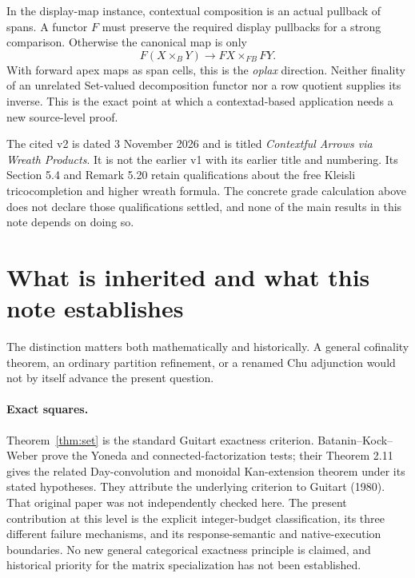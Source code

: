 \documentclass[11pt]{article}
\theoremstyle{definition}\newtheorem{definition}[theorem]{Definition}
\theoremstyle{remark}\newtheorem{remark}[theorem]{Remark}
\begin{document}
In the display-map instance, contextual composition is an actual pullback
of spans. A functor $F$ must preserve the required display pullbacks for
a strong comparison. Otherwise the canonical map is only
\[
 F(X\times_BY)\longrightarrow FX\times_{FB}FY.
\]
With forward apex maps as span cells, this is the \emph{oplax} direction.
Neither finality of an unrelated Set-valued decomposition functor nor a
row quotient supplies its inverse. This is the exact point at which a
contextad-based application needs a new source-level proof.

The cited v2 is dated 3 November 2026 and is titled \emph{Contextful
Arrows via Wreath Products}. It is not the earlier v1 with its earlier
title and numbering. Its Section 5.4 and Remark 5.20 retain qualifications
about the free Kleisli tricocompletion and higher wreath formula. The
concrete grade calculation above does not declare those qualifications
settled, and none of the main results in this note depends on doing so.


\section{What is inherited and what this note establishes}\label{sec:prior}
The distinction matters both mathematically and historically. A general
cofinality theorem, an ordinary partition refinement, or a renamed Chu
adjunction would not by itself advance the present question.

\paragraph{Exact squares.}
Theorem~\ref{thm:set} is the standard Guitart exactness criterion.
Batanin--Kock--Weber \cite[Lemmas 2.2 and 2.4]{BKW} prove the Yoneda
and connected-factorization tests; their Theorem 2.11 gives the related
Day-convolution and monoidal Kan-extension theorem under its stated
hypotheses. They attribute the underlying criterion to Guitart (1980).
That original paper was not independently checked here. The present
contribution at this level is the explicit integer-budget classification,
its three different failure mechanisms, and its response-semantic and
native-execution boundaries. No new general categorical exactness principle
is claimed, and historical priority for the matrix specialization has not
been established.
\end{document}
